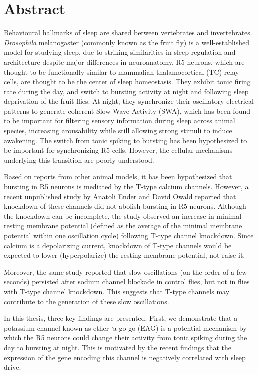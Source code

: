 \documentclass[../main.tex]{subfiles}
\begin{document}
\section*{Abstract}

Behavioural hallmarks of sleep are shared between vertebrates and
invertebrates. \textit{Drosophila} melanogaster (commonly known as the
fruit fly) is a well-established model for studying sleep, due to 
striking similarities in sleep regulation
and architecture despite major differences in neuroanatomy.
R5 neurons, which are thought to be functionally similar to mammalian
thalamocortical (TC) relay cells, are thought to be the center of
sleep homeostasis. They exhibit tonic firing rate during the day, and switch to
bursting activity at night and following sleep deprivation of the fruit flies.
At night, they synchronize their oscillatory electrical patterns to
generate coherent Slow Wave Activity (SWA), which has been found to be
important for filtering sensory information during sleep across animal species,
increasing arousability while still allowing strong stimuli to induce awakening.
The switch from tonic spiking to bursting has been hypothesized to be
important for synchronizing R5 cells. However, the cellular mechanisms
underlying this transition are poorly understood.

Based on reports from other animal models, it has been hypothesized that bursting in R5 neurons is mediated by the T-type calcium channels.
However, a recent unpublished study by Anatoli Ender and David Owald
reported that knockdown of these channels did not abolish bursting in R5 neurons. Although the knockdown can be incomplete, the study observed an increase in minimal resting membrane potential (defined as the average of the minimal membrane potential within one oscillation cycle) following T-type channel knockdown. Since calcium is a depolarizing current, knockdown of T-type channels would be expected to lower (hyperpolarize) the resting membrane potential, not raise it.

Moreover, the same study reported that slow oscillations (on the order of a few seconds) persisted after sodium channel blockade in control flies, but not in flies with T-type channel knockdown. This suggests that T-type channels may contribute to the generation of these slow oscillations.

In this thesis, three key findings are presented.
First, we demonstrate that a potassium channel known as ether-`a-go-go (EAG) is a potential mechanism by which the R5 neurons could change their activity from tonic spiking during the day to bursting at night. This is motivated by the recent findings that the expression of the gene encoding this channel is negatively correlated with sleep drive.
\end{document}
